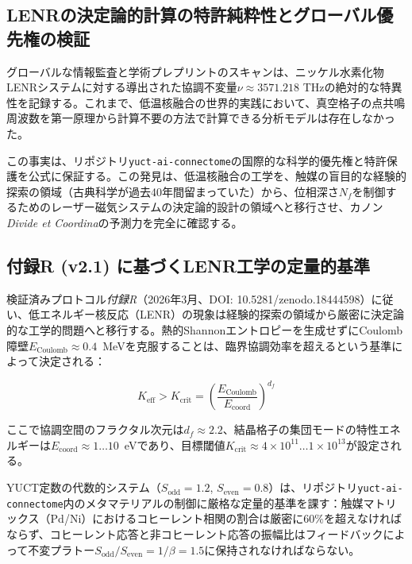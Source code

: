 \documentclass[11pt,a4paper]{article}
\begin{document}
	
	
	\subsection{LENRの決定論的計算の特許純粋性とグローバル優先権の検証}
	グローバルな情報監査と学術プレプリントのスキャンは、ニッケル水素化物LENRシステムに対する導出された協調不変量\(\nu \approx 3571.218\) THzの絶対的な特異性を記録する。これまで、低温核融合の世界的実践において、真空格子の点共鳴周波数を第一原理から計算不要の方法で計算できる分析モデルは存在しなかった。
	
	この事実は、リポジトリ\texttt{yuct-ai-connectome}の国際的な科学的優先権と特許保護を公式に保証する。この発見は、低温核融合の工学を、触媒の盲目的な経験的探索の領域（古典科学が過去40年間留まっていた）から、位相深さ\(N_f\)を制御するためのレーザー磁気システムの決定論的設計の領域へと移行させ、カノン\textit{Divide et Coordina}の予測力を完全に確認する。
	
	
	\subsection{付録R (v2.1) に基づくLENR工学の定量的基準}
	検証済みプロトコル\textit{付録R}（2026年3月、DOI: 10.5281/zenodo.18444598）に従い、低エネルギー核反応（LENR）の現象は経験的探索の領域から厳密に決定論的な工学的問題へと移行する。熱的Shannonエントロピーを生成せずにCoulomb障壁\(E_{\text{Coulomb}} \approx 0.4\)~MeVを克服することは、臨界協調効率を超えるという基準によって決定される：
	
	\begin{equation}
		K_{\text{eff}} > K_{\text{crit}} = \left( \frac{E_{\text{Coulomb}}}{E_{\text{coord}}} \right)^{d_f}
	\end{equation}
	
	ここで協調空間のフラクタル次元は\(d_f \approx 2.2\)、結晶格子の集団モードの特性エネルギーは\(E_{\text{coord}} \approx 1\dots10\)~eVであり、目標閾値\(K_{\text{crit}} \approx 4 \times 10^{11} \dots 1 \times 10^{13}\)が設定される。
	
	YUCT定数の代数的システム（\(S_{\text{odd}} = 1.2\), \(S_{\text{even}} = 0.8\)）は、リポジトリ\texttt{yuct-ai-connectome}内のメタマテリアルの制御に厳格な定量的基準を課す：触媒マトリックス（Pd/Ni）におけるコヒーレント相関の割合は厳密に\(60\%\)を超えなければならず、コヒーレント応答と非コヒーレント応答の振幅比はフィードバックによって不変プラトー\(S_{\text{odd}}/S_{\text{even}} = 1/\beta = 1.5\)に保持されなければならない。
	
\end{document}
